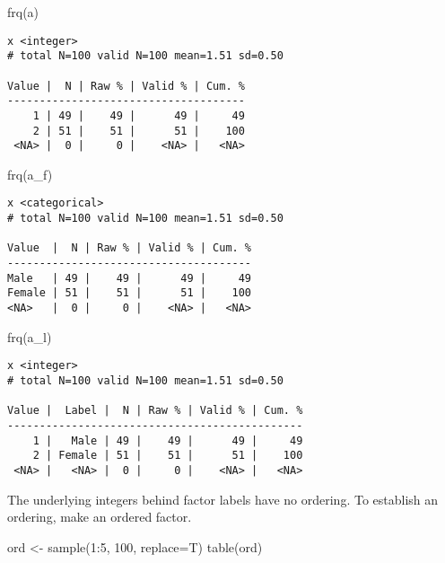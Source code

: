 \documentclass[
  letterpaper,
  DIV=11,
  numbers=noendperiod]{scrreprt}
\newenvironment{Shaded}{\begin{snugshade}}{\end{snugshade}}
\newcommand{\AttributeTok}[1]{\textcolor[rgb]{0.40,0.45,0.13}{#1}}
\newcommand{\DecValTok}[1]{\textcolor[rgb]{0.68,0.00,0.00}{#1}}
\newcommand{\FunctionTok}[1]{\textcolor[rgb]{0.28,0.35,0.67}{#1}}
\newcommand{\NormalTok}[1]{\textcolor[rgb]{0.00,0.23,0.31}{#1}}
\newcommand{\OtherTok}[1]{\textcolor[rgb]{0.00,0.23,0.31}{#1}}
\newcommand{\SpecialCharTok}[1]{\textcolor[rgb]{0.37,0.37,0.37}{#1}}
\begin{document}
\begin{Shaded}
\begin{Highlighting}[]
\FunctionTok{frq}\NormalTok{(a)}
\end{Highlighting}
\end{Shaded}

\begin{verbatim}
x <integer> 
# total N=100 valid N=100 mean=1.51 sd=0.50

Value |  N | Raw % | Valid % | Cum. %
-------------------------------------
    1 | 49 |    49 |      49 |     49
    2 | 51 |    51 |      51 |    100
 <NA> |  0 |     0 |    <NA> |   <NA>
\end{verbatim}

\begin{Shaded}
\begin{Highlighting}[]
\FunctionTok{frq}\NormalTok{(a\_f)}
\end{Highlighting}
\end{Shaded}

\begin{verbatim}
x <categorical> 
# total N=100 valid N=100 mean=1.51 sd=0.50

Value  |  N | Raw % | Valid % | Cum. %
--------------------------------------
Male   | 49 |    49 |      49 |     49
Female | 51 |    51 |      51 |    100
<NA>   |  0 |     0 |    <NA> |   <NA>
\end{verbatim}

\begin{Shaded}
\begin{Highlighting}[]
\FunctionTok{frq}\NormalTok{(a\_l)}
\end{Highlighting}
\end{Shaded}

\begin{verbatim}
x <integer> 
# total N=100 valid N=100 mean=1.51 sd=0.50

Value |  Label |  N | Raw % | Valid % | Cum. %
----------------------------------------------
    1 |   Male | 49 |    49 |      49 |     49
    2 | Female | 51 |    51 |      51 |    100
 <NA> |   <NA> |  0 |     0 |    <NA> |   <NA>
\end{verbatim}

The underlying integers behind factor labels have no ordering. To
establish an ordering, make an ordered factor.

\begin{Shaded}
\begin{Highlighting}[]
\NormalTok{ord }\OtherTok{\textless{}{-}} \FunctionTok{sample}\NormalTok{(}\DecValTok{1}\SpecialCharTok{:}\DecValTok{5}\NormalTok{, }\DecValTok{100}\NormalTok{, }\AttributeTok{replace=}\NormalTok{T)}
\FunctionTok{table}\NormalTok{(ord)}
\end{Highlighting}
\end{Shaded}
\end{document}
